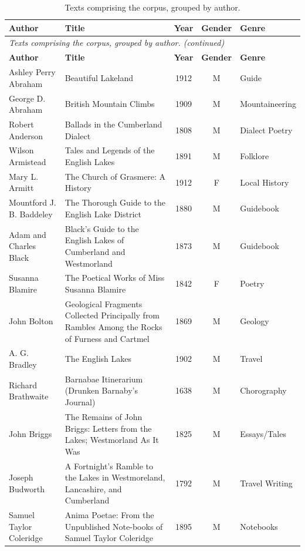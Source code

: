 \begin{longtable}{@{}p{3.2cm} p{5.0cm} c c p{3.2cm}@{}}
\caption{Texts comprising the corpus, grouped by author.}\label{tab:corpus-texts} \\
\toprule
\textbf{Author} & \textbf{Title} & \textbf{Year} & \textbf{Gender} & \textbf{Genre} \\
\midrule
\endfirsthead
\multicolumn{5}{l}{\textit{Texts comprising the corpus, grouped by author. (continued)}} \\
\toprule
\textbf{Author} & \textbf{Title} & \textbf{Year} & \textbf{Gender} & \textbf{Genre} \\
\midrule
\endhead
\bottomrule
\endfoot
\bottomrule
\endlastfoot
Ashley Perry Abraham & Beautiful Lakeland & 1912 & M & Guide \\
George D. Abraham & British Mountain Climbs & 1909 & M & Mountaineering \\
Robert Anderson & Ballads in the Cumberland Dialect & 1808 & M & Dialect Poetry \\
Wilson Armistead & Tales and Legends of the English Lakes & 1891 & M & Folklore \\
Mary L. Armitt & The Church of Grasmere: A History & 1912 & F & Local History \\
Mountford J. B. Baddeley & The Thorough Guide to the English Lake District & 1880 & M & Guidebook \\
Adam and Charles Black & Black's Guide to the English Lakes of Cumberland and Westmorland & 1873 & M & Guidebook \\
Susanna Blamire & The Poetical Works of Miss Susanna Blamire & 1842 & F & Poetry \\
John Bolton & Geological Fragments Collected Principally from Rambles Among the Rocks of Furness and Cartmel & 1869 & M & Geology \\
A. G. Bradley & The English Lakes & 1902 & M & Travel \\
Richard Brathwaite & Barnabae Itinerarium (Drunken Barnaby's Journal) & 1638 & M & Chorography \\
John Briggs & The Remains of John Briggs: Letters from the Lakes; Westmorland As It Was & 1825 & M & Essays/Tales \\
Joseph Budworth & A Fortnight's Ramble to the Lakes in Westmoreland, Lancashire, and Cumberland & 1792 & M & Travel Writing \\
\multirow[t]{2}{3.2cm}{Samuel Taylor Coleridge} & Anima Poetae: From the Unpublished Note-books of Samuel Taylor Coleridge & 1895 & \multirow[t]{2}{*}{M} & Notebooks \\

\end{longtable}
